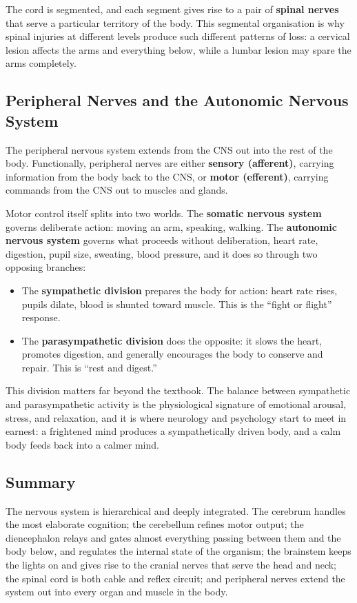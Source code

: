 \documentclass[11pt]{article}
\begin{document}
The cord is segmented, and each segment gives rise to a pair of \textbf{spinal nerves} that serve a particular territory of the body. This segmental organisation is why spinal injuries at different levels produce such different patterns of loss: a cervical lesion affects the arms and everything below, while a lumbar lesion may spare the arms completely.

\subsection{Peripheral Nerves and the Autonomic Nervous System}

The peripheral nervous system extends from the CNS out into the rest of the body. Functionally, peripheral nerves are either \textbf{sensory (afferent)}, carrying information from the body back to the CNS, or \textbf{motor (efferent)}, carrying commands from the CNS out to muscles and glands.

Motor control itself splits into two worlds. The \textbf{somatic nervous system} governs deliberate action: moving an arm, speaking, walking. The \textbf{autonomic nervous system} governs what proceeds without deliberation, heart rate, digestion, pupil size, sweating, blood pressure, and it does so through two opposing branches:

\begin{itemize}
    \item The \textbf{sympathetic division} prepares the body for action: heart rate rises, pupils dilate, blood is shunted toward muscle. This is the ``fight or flight'' response.
    \item The \textbf{parasympathetic division} does the opposite: it slows the heart, promotes digestion, and generally encourages the body to conserve and repair. This is ``rest and digest.''
\end{itemize}

This division matters far beyond the textbook. The balance between sympathetic and parasympathetic activity is the physiological signature of emotional arousal, stress, and relaxation, and it is where neurology and psychology start to meet in earnest: a frightened mind produces a sympathetically driven body, and a calm body feeds back into a calmer mind.

\subsection{Summary}

The nervous system is hierarchical and deeply integrated. The cerebrum handles the most elaborate cognition; the cerebellum refines motor output; the diencephalon relays and gates almost everything passing between them and the body below, and regulates the internal state of the organism; the brainstem keeps the lights on and gives rise to the cranial nerves that serve the head and neck; the spinal cord is both cable and reflex circuit; and peripheral nerves extend the system out into every organ and muscle in the body.
\end{document}
